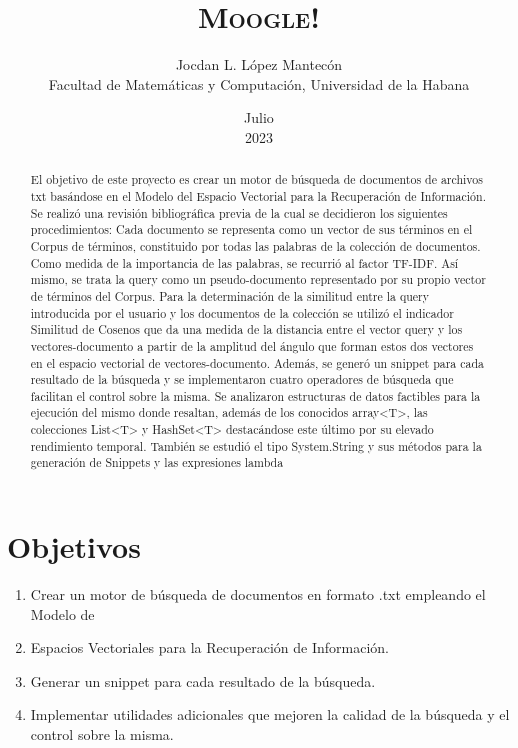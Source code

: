 \documentclass[a4paper,12pt]{article}
\begin{document}
\begin{titlepage}
\title{ \textsc{\large Moogle!}}
\author{Jocdan L. López Mantecón \\ Facultad de Matemáticas y Computación, Universidad de la Habana}
\date{Julio \\ 2023}
\maketitle

\begin{abstract}
El objetivo de este proyecto es crear un motor de búsqueda de documentos de archivos txt
basándose en el Modelo del Espacio Vectorial para la Recuperación de Información. Se realizó
una revisión bibliográfica previa de la cual se decidieron los siguientes procedimientos: Cada
documento se representa como un vector de sus términos en el Corpus de términos, constituido
por todas las palabras de la colección de documentos. Como medida de la importancia de las
palabras, se recurrió al factor TF-IDF. Así mismo, se trata la query como un pseudo-documento
representado por su propio vector de términos del Corpus. Para la determinación de la similitud
entre la query introducida por el usuario y los documentos de la colección se utilizó el indicador
Similitud de Cosenos que da una medida de la distancia entre el vector query y los vectores-documento
a partir de la amplitud del ángulo que forman estos dos vectores en el espacio
vectorial de vectores-documento. Además, se generó un snippet para cada resultado de la
búsqueda y se implementaron cuatro operadores de búsqueda que facilitan el control sobre la
misma.
Se analizaron estructuras de datos factibles para la ejecución del mismo donde
resaltan, además de los conocidos array<T>, las colecciones List<T> y HashSet<T>
destacándose este último por su elevado rendimiento temporal. También se estudió el tipo
System.String y sus métodos para la generación de Snippets y las expresiones lambda
\end{abstract}
\end{titlepage}

\section*{Objetivos}
\begin{enumerate}
    \item Crear un motor de búsqueda de documentos en formato .txt empleando el Modelo de
    \item Espacios Vectoriales para la Recuperación de Información.
    \item Generar un snippet para cada resultado de la búsqueda.
    \item Implementar utilidades adicionales que mejoren la calidad de la búsqueda y el
    control sobre la misma.
    \end{enumerate}
\end{document}
